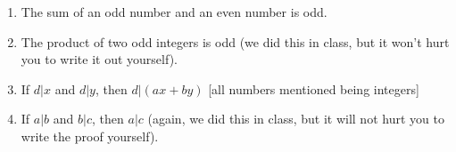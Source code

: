 \documentclass[12pt]{article}
\begin{document}
\begin{enumerate}

\item  The sum of an odd number and an even number is odd.

\item  The product of two odd integers is odd (we did this in class, but it won't hurt you to write it out yourself).

\item  If $d|x$ and $d|y$, then $d|(ax + by)$ [all numbers mentioned being integers]

\item If $a|b$ and $b|c$, then $a|c$ (again, we did this in class, but it will not hurt you to write the proof yourself).


\end{enumerate}
\end{document}
